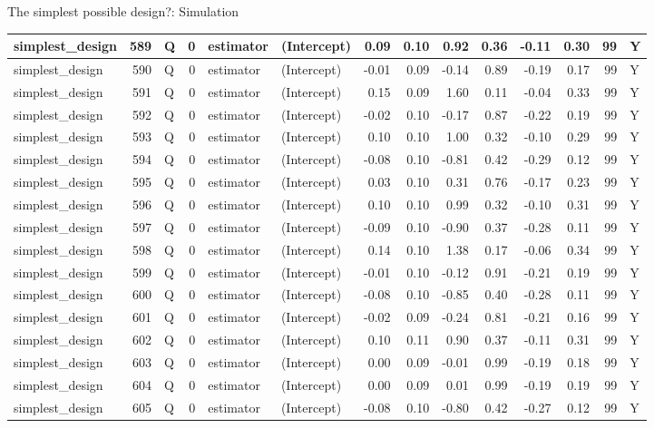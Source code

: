 \documentclass[
  11pt,
  ignorenonframetext,
]{beamer}
\begin{document}
\begin{frame}[fragile]{The simplest possible design?: Simulation}
\begin{tabular}{l|r|l|r|l|l|r|r|r|r|r|r|r|l}
\hline
simplest\_design & 589 & Q & 0 & estimator & (Intercept) & 0.09 & 0.10 & 0.92 & 0.36 & -0.11 & 0.30 & 99 & Y\\
\hline
simplest\_design & 590 & Q & 0 & estimator & (Intercept) & -0.01 & 0.09 & -0.14 & 0.89 & -0.19 & 0.17 & 99 & Y\\
\hline
simplest\_design & 591 & Q & 0 & estimator & (Intercept) & 0.15 & 0.09 & 1.60 & 0.11 & -0.04 & 0.33 & 99 & Y\\
\hline
simplest\_design & 592 & Q & 0 & estimator & (Intercept) & -0.02 & 0.10 & -0.17 & 0.87 & -0.22 & 0.19 & 99 & Y\\
\hline
simplest\_design & 593 & Q & 0 & estimator & (Intercept) & 0.10 & 0.10 & 1.00 & 0.32 & -0.10 & 0.29 & 99 & Y\\
\hline
simplest\_design & 594 & Q & 0 & estimator & (Intercept) & -0.08 & 0.10 & -0.81 & 0.42 & -0.29 & 0.12 & 99 & Y\\
\hline
simplest\_design & 595 & Q & 0 & estimator & (Intercept) & 0.03 & 0.10 & 0.31 & 0.76 & -0.17 & 0.23 & 99 & Y\\
\hline
simplest\_design & 596 & Q & 0 & estimator & (Intercept) & 0.10 & 0.10 & 0.99 & 0.32 & -0.10 & 0.31 & 99 & Y\\
\hline
simplest\_design & 597 & Q & 0 & estimator & (Intercept) & -0.09 & 0.10 & -0.90 & 0.37 & -0.28 & 0.11 & 99 & Y\\
\hline
simplest\_design & 598 & Q & 0 & estimator & (Intercept) & 0.14 & 0.10 & 1.38 & 0.17 & -0.06 & 0.34 & 99 & Y\\
\hline
simplest\_design & 599 & Q & 0 & estimator & (Intercept) & -0.01 & 0.10 & -0.12 & 0.91 & -0.21 & 0.19 & 99 & Y\\
\hline
simplest\_design & 600 & Q & 0 & estimator & (Intercept) & -0.08 & 0.10 & -0.85 & 0.40 & -0.28 & 0.11 & 99 & Y\\
\hline
simplest\_design & 601 & Q & 0 & estimator & (Intercept) & -0.02 & 0.09 & -0.24 & 0.81 & -0.21 & 0.16 & 99 & Y\\
\hline
simplest\_design & 602 & Q & 0 & estimator & (Intercept) & 0.10 & 0.11 & 0.90 & 0.37 & -0.11 & 0.31 & 99 & Y\\
\hline
simplest\_design & 603 & Q & 0 & estimator & (Intercept) & 0.00 & 0.09 & -0.01 & 0.99 & -0.19 & 0.18 & 99 & Y\\
\hline
simplest\_design & 604 & Q & 0 & estimator & (Intercept) & 0.00 & 0.09 & 0.01 & 0.99 & -0.19 & 0.19 & 99 & Y\\
\hline
simplest\_design & 605 & Q & 0 & estimator & (Intercept) & -0.08 & 0.10 & -0.80 & 0.42 & -0.27 & 0.12 & 99 & Y\\

\end{tabular}
\end{frame}
\end{document}
